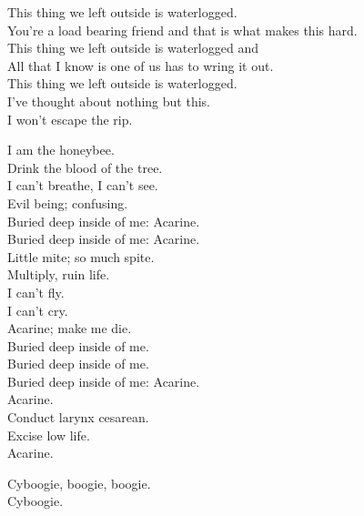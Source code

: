 This thing we left outside is waterlogged. \\
You're a load bearing friend and that is what makes this hard. \\
This thing we left outside is waterlogged and \\
All that I know is one of us has to wring it out. \\
This thing we left outside is waterlogged. \\
I've thought about nothing but this. \\
I won't escape the rip. \\




I am the honeybee. \\
Drink the blood of the tree. \\
I can't breathe, I can't see. \\
Evil being; confusing. \\

Buried deep inside of me: Acarine. \\
Buried deep inside of me: Acarine. \\

Little mite; so much spite. \\
Multiply, ruin life. \\
I can't fly. \\
I can't cry. \\
Acarine; make me die. \\

Buried deep inside of me. \\
Buried deep inside of me. \\
Buried deep inside of me: Acarine. \\

Acarine. \\
Conduct larynx cesarean. \\
Excise low life. \\
Acarine. \\




Cyboogie, boogie, boogie. \\
Cyboogie. \\


